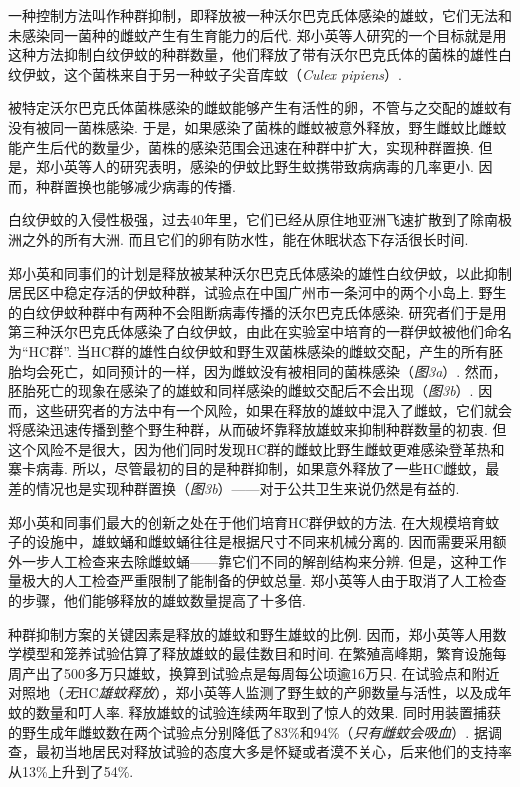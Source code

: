 \begin{multicols}{2}
一种控制方法叫作种群抑制，即释放被一种沃尔巴克氏体感染的雄蚊，它们无法和未感染同一菌种的雌蚊产生有生育能力的后代. 郑小英等人研究的一个目标就是用这种方法抑制白纹伊蚊的种群数量，他们释放了带有沃尔巴克氏体的\wPip 菌株的雄性白纹伊蚊，这个菌株来自于另一种蚊子尖音库蚊（\textit{Culex pipiens}）. 

被特定沃尔巴克氏体菌株感染的雌蚊能够产生有活性的卵，不管与之交配的雄蚊有没有被同一菌株感染. 于是，如果感染了\wPip 菌株的雌蚊被意外释放，野生雌蚊比\wPip 雌蚊能产生后代的数量少，\wPip 菌株的感染范围会迅速在种群中扩大，实现种群置换. 但是，郑小英等人的研究表明，感染\wPip 的伊蚊比野生蚊携带致病病毒的几率更小. 因而，种群置换也能够减少病毒的传播. 

白纹伊蚊的入侵性极强，过去40年里，它们已经从原住地亚洲飞速扩散到了除南极洲之外的所有大洲. 而且它们的卵有防水性，能在休眠状态下存活很长时间. 

郑小英和同事们的计划是释放被某种沃尔巴克氏体感染的雄性白纹伊蚊，以此抑制居民区中稳定存活的伊蚊种群，试验点在中国广州市一条河中的两个小岛上. 野生的白纹伊蚊种群中有两种不会阻断病毒传播的沃尔巴克氏体感染. 研究者们于是用第三种沃尔巴克氏体感染了白纹伊蚊，由此在实验室中培育的一群伊蚊被他们命名为“HC群”. 当HC群的雄性白纹伊蚊和野生双菌株感染的雌蚊交配，产生的所有胚胎均会死亡，如同预计的一样，因为雌蚊没有被相同的\wPip 菌株感染（\textit{图3a}）. 然而，胚胎死亡的现象在感染了\wPip 的雄蚊和同样感染\wPip 的雌蚊交配后不会出现（\textit{图3b}）. 因而，这些研究者的方法中有一个风险，如果在释放的\wPip 雄蚊中混入了\wPip 雌蚊，它们就会将\wPip 感染迅速传播到整个野生种群，从而破坏靠释放\wPip 雄蚊来抑制种群数量的初衷. 但这个风险不是很大，因为他们同时发现HC群的雌蚊比野生雌蚊更难感染登革热和寨卡病毒. 所以，尽管最初的目的是种群抑制，如果意外释放了一些HC雌蚊，最差的情况也是实现种群置换（\textit{图3b}）——对于公共卫生来说仍然是有益的. 

郑小英和同事们最大的创新之处在于他们培育HC群伊蚊的方法. 在大规模培育蚊子的设施中，雄蚊蛹和雌蚊蛹往往是根据尺寸不同来机械分离的. 因而需要采用额外一步人工检查来去除雌蚊蛹——靠它们不同的解剖结构来分辨. 但是，这种工作量极大的人工检查严重限制了能制备的伊蚊总量. 郑小英等人由于取消了人工检查的步骤，他们能够释放的雄蚊数量提高了十多倍. 

种群抑制方案的关键因素是释放的雄蚊和野生雄蚊的比例. 因而，郑小英等人用数学模型和笼养试验估算了释放雄蚊的最佳数目和时间. 在繁殖高峰期，繁育设施每周产出了500多万只雄蚊，换算到试验点是每周每公顷逾16万只. 在试验点和附近对照地（\textit{无}HC\textit{雄蚊释放}），郑小英等人监测了野生蚊的产卵数量与活性，以及成年蚊的数量和叮人率. 释放雄蚊的试验连续两年取到了惊人的效果. 同时用装置捕获的野生成年雌蚊数在两个试验点分别降低了83\%和94\%（\textit{只有雌蚊会吸血}）. 据调查，最初当地居民对释放试验的态度大多是怀疑或者漠不关心，后来他们的支持率从13\%上升到了54\%. 


\end{multicols}

